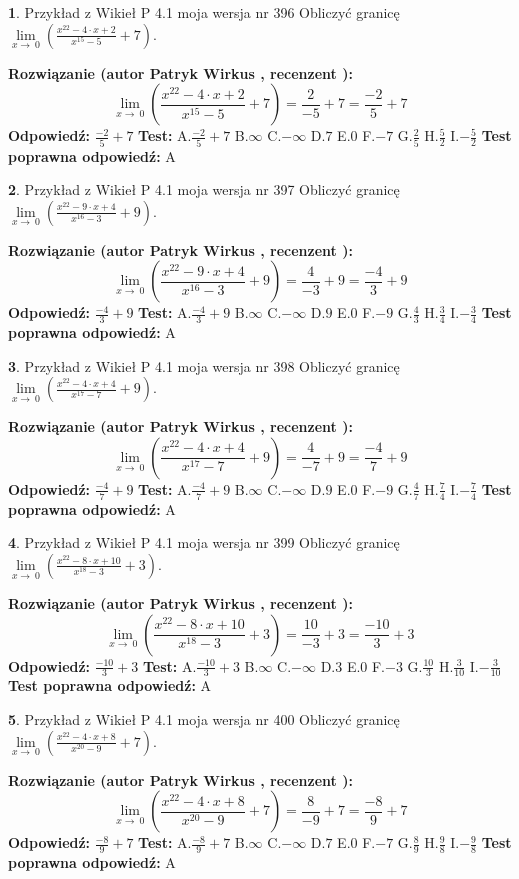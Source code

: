 \documentclass[12pt, a4paper]{article}
\theoremstyle{definition} %
\newtheorem{zad}{}
\newcommand{\zadStart}[1]{\begin{zad}#1\newline}
\newcommand{\zadStop}{\end{zad}}
\newcommand{\rozwStart}[2]{\noindent \textbf{Rozwiązanie (autor #1 , recenzent #2): }\newline}
\newcommand{\rozwStop}{\newline}
\newcommand{\odpStart}{\noindent \textbf{Odpowiedź:}\newline}
\newcommand{\odpStop}{\newline}
\newcommand{\testStart}{\noindent \textbf{Test:}\newline}
\newcommand{\testStop}{\newline}
\newcommand{\kluczStart}{\noindent \textbf{Test poprawna odpowiedź:}\newline}
\newcommand{\kluczStop}{\newline}
\begin{document}
\zadStart{Przykład z Wikieł P 4.1 moja wersja nr 396}
Obliczyć granicę $\lim\limits_{x\to\ 0}(\frac{x^{22}-4 \cdot x +2}{x^{15}-5}+7)$.
\zadStop
\rozwStart{Patryk Wirkus}{}
$$\lim\limits_{x\to\ 0}(\frac{x^{22}-4 \cdot x +2}{x^{15}-5}+7)=\frac{2}{-5}+7=\frac{-2}{5}+7$$
\rozwStop
\odpStart
$\frac{-2}{5}+7$
\odpStop
\testStart
A.$\frac{-2}{5}+7$
B.$\infty$
C.$-\infty$
D.$7$
E.$0$
F.$-7$
G.$\frac{2}{5}$
H.$\frac{5}{2}$
I.$-\frac{5}{2}$
\testStop
\kluczStart
A
\kluczStop



\zadStart{Przykład z Wikieł P 4.1 moja wersja nr 397}
Obliczyć granicę $\lim\limits_{x\to\ 0}(\frac{x^{22}-9 \cdot x +4}{x^{16}-3}+9)$.
\zadStop
\rozwStart{Patryk Wirkus}{}
$$\lim\limits_{x\to\ 0}(\frac{x^{22}-9 \cdot x +4}{x^{16}-3}+9)=\frac{4}{-3}+9=\frac{-4}{3}+9$$
\rozwStop
\odpStart
$\frac{-4}{3}+9$
\odpStop
\testStart
A.$\frac{-4}{3}+9$
B.$\infty$
C.$-\infty$
D.$9$
E.$0$
F.$-9$
G.$\frac{4}{3}$
H.$\frac{3}{4}$
I.$-\frac{3}{4}$
\testStop
\kluczStart
A
\kluczStop



\zadStart{Przykład z Wikieł P 4.1 moja wersja nr 398}
Obliczyć granicę $\lim\limits_{x\to\ 0}(\frac{x^{22}-4 \cdot x +4}{x^{17}-7}+9)$.
\zadStop
\rozwStart{Patryk Wirkus}{}
$$\lim\limits_{x\to\ 0}(\frac{x^{22}-4 \cdot x +4}{x^{17}-7}+9)=\frac{4}{-7}+9=\frac{-4}{7}+9$$
\rozwStop
\odpStart
$\frac{-4}{7}+9$
\odpStop
\testStart
A.$\frac{-4}{7}+9$
B.$\infty$
C.$-\infty$
D.$9$
E.$0$
F.$-9$
G.$\frac{4}{7}$
H.$\frac{7}{4}$
I.$-\frac{7}{4}$
\testStop
\kluczStart
A
\kluczStop



\zadStart{Przykład z Wikieł P 4.1 moja wersja nr 399}
Obliczyć granicę $\lim\limits_{x\to\ 0}(\frac{x^{22}-8 \cdot x +10}{x^{18}-3}+3)$.
\zadStop
\rozwStart{Patryk Wirkus}{}
$$\lim\limits_{x\to\ 0}(\frac{x^{22}-8 \cdot x +10}{x^{18}-3}+3)=\frac{10}{-3}+3=\frac{-10}{3}+3$$
\rozwStop
\odpStart
$\frac{-10}{3}+3$
\odpStop
\testStart
A.$\frac{-10}{3}+3$
B.$\infty$
C.$-\infty$
D.$3$
E.$0$
F.$-3$
G.$\frac{10}{3}$
H.$\frac{3}{10}$
I.$-\frac{3}{10}$
\testStop
\kluczStart
A
\kluczStop



\zadStart{Przykład z Wikieł P 4.1 moja wersja nr 400}
Obliczyć granicę $\lim\limits_{x\to\ 0}(\frac{x^{22}-4 \cdot x +8}{x^{20}-9}+7)$.
\zadStop
\rozwStart{Patryk Wirkus}{}
$$\lim\limits_{x\to\ 0}(\frac{x^{22}-4 \cdot x +8}{x^{20}-9}+7)=\frac{8}{-9}+7=\frac{-8}{9}+7$$
\rozwStop
\odpStart
$\frac{-8}{9}+7$
\odpStop
\testStart
A.$\frac{-8}{9}+7$
B.$\infty$
C.$-\infty$
D.$7$
E.$0$
F.$-7$
G.$\frac{8}{9}$
H.$\frac{9}{8}$
I.$-\frac{9}{8}$
\testStop
\kluczStart
A
\kluczStop
\end{document}
